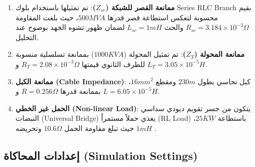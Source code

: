 \documentclass[12pt, a4paper, twoside]{article} %
\newcommand{\el}{\textenglish} %
\begin{document}
\begin{enumerate}
\begin{center}
\begin{LTR}
    \end{LTR}
  \end{center}
  \item \textbf{ممانعة القصر للشبكة ($Z_{sc}$)}: تم تمثيلها باستخدام بلوك \el{Series RLC Branch} بقيم محسوبة لتعكس استطاعة قصر قدرها $500 MVA$، حيث بلغت المقاومة $R_{sc} = 3.184 \times 10^{-3} \Omega$ والحث $L_{sc} = 1 mH$ لضمان ظهور تشوه الجهد بوضوح عند التحليل.\newpage
  \item \textbf{ممانعة المحولة ($Z_{T}$)}:
  تم تمثيل المحولة ($1000 KVA$) بممانعة تسلسلية منسوبة للطرف الثانوي قيمتها $R_T = 2.08 \times 10^{-3} \Omega$ و $L_T = 3.05 \times 10^{-5} H$.
  \item \textbf{ممانعة الكبل \el{(Cable Impedance)}}: كبل نحاسي بطول $230 m$ ومقطع $16 mm^2$، بممانعة قدرها $R = 0.256 \Omega$ و $L = 6.05 \times 10^{-5} H$.
  \item \textbf{الحمل غير الخطي \el{(Non-linear Load)}}:
  يتكون من جسر تقويم ديودي سداسي النبضات \el{(Universal Bridge)} يغذي حملاً مستمراً \el{(RL Load)} باستطاعة $25 KW$، حيث تبلغ مقاومة الحمل $10.6 \Omega$ وتحريضه $1 mH$ .
\end{enumerate}

\subsection{إعدادات المحاكاة \el{(Simulation Settings)}}
\end{document}
